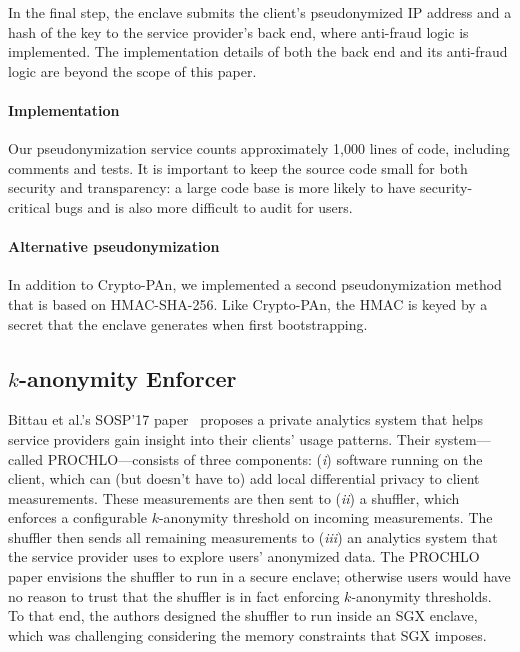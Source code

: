 In the final step, the enclave submits the client's pseudonymized IP address and
a hash of the key to the service provider's back end, where anti-fraud logic is
implemented.  The implementation details of both the back end and its anti-fraud
logic are beyond the scope of this paper.

\paragraph{Implementation}
Our pseudonymization service counts approximately 1,000 lines of code, including
comments and tests.  It is important to keep the source code small for both
security and transparency: a large code base is more likely to have
security-critical bugs and is also more difficult to audit for users.

\paragraph{Alternative pseudonymization}
In addition to Crypto-PAn, we implemented a second pseudonymization method that
is based on HMAC-SHA-256.  Like Crypto-PAn, the HMAC is keyed by a secret that
the enclave generates when first bootstrapping.

\subsection{$k$-anonymity Enforcer}
\label{sec:shuffler}

Bittau et al.'s SOSP'17 paper~\cite{Bittau2017a} proposes a private analytics
system that helps service providers gain insight into their clients' usage
patterns.  Their system---called PROCHLO---consists of three components:
(\emph{i}) software running on the client, which can (but doesn't have to) add
local differential privacy to client measurements.  These measurements are then
sent to (\emph{ii}) a shuffler, which enforces a configurable $k$-anonymity
threshold on incoming measurements.  The shuffler then sends all remaining
measurements to (\emph{iii}) an analytics system that the service provider uses
to explore users' anonymized data.  The PROCHLO paper envisions the shuffler to
run in a secure enclave; otherwise users would have no reason to trust that the
shuffler is in fact enforcing $k$-anonymity thresholds.  To that end, the
authors designed the shuffler to run inside an SGX enclave, which was
challenging considering the memory constraints that SGX imposes.


